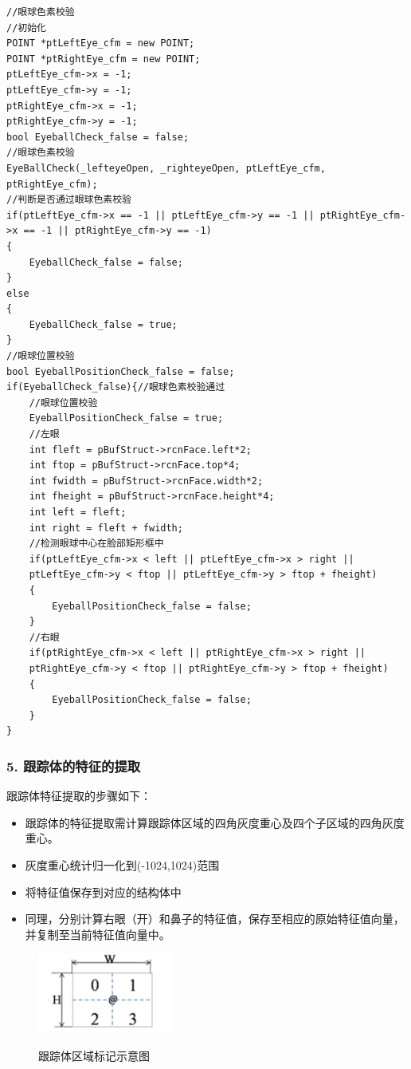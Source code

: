 \documentclass[12pt,hyperref,a4paper,UTF8]{ctexart}
\begin{document}
\begin{lstlisting}[caption={眼球色素和眼球位置校验}, label={lst:example}]
//眼球色素校验
//初始化
POINT *ptLeftEye_cfm = new POINT;
POINT *ptRightEye_cfm = new POINT;
ptLeftEye_cfm->x = -1;
ptLeftEye_cfm->y = -1;
ptRightEye_cfm->x = -1;
ptRightEye_cfm->y = -1;
bool EyeballCheck_false = false;
//眼球色素校验
EyeBallCheck(_lefteyeOpen, _righteyeOpen, ptLeftEye_cfm, ptRightEye_cfm);
//判断是否通过眼球色素校验
if(ptLeftEye_cfm->x == -1 || ptLeftEye_cfm->y == -1 || ptRightEye_cfm->x == -1 || ptRightEye_cfm->y == -1)
{
    EyeballCheck_false = false;
}
else
{
    EyeballCheck_false = true;
}
//眼球位置校验
bool EyeballPositionCheck_false = false;
if(EyeballCheck_false){//眼球色素校验通过
    //眼球位置校验
    EyeballPositionCheck_false = true;
    //左眼
    int fleft = pBufStruct->rcnFace.left*2;
    int ftop = pBufStruct->rcnFace.top*4;
    int fwidth = pBufStruct->rcnFace.width*2;
    int fheight = pBufStruct->rcnFace.height*4;
    int left = fleft;
    int right = fleft + fwidth;
    //检测眼球中心在脸部矩形框中
    if(ptLeftEye_cfm->x < left || ptLeftEye_cfm->x > right || 
    ptLeftEye_cfm->y < ftop || ptLeftEye_cfm->y > ftop + fheight)
    {
        EyeballPositionCheck_false = false;
    }
    //右眼
    if(ptRightEye_cfm->x < left || ptRightEye_cfm->x > right || 
    ptRightEye_cfm->y < ftop || ptRightEye_cfm->y > ftop + fheight)
    {
        EyeballPositionCheck_false = false;
    }
}
        \end{lstlisting}




        \subsubsection*{\large \textbf{5. 跟踪体的特征的提取}}
        跟踪体特征提取的步骤如下：
        \begin{itemize}
            \item 跟踪体的特征提取需计算跟踪体区域的四角灰度重心及四个子区域的四角灰度重心。
            \item 灰度重心统计归一化到(-1024,1024)范围
            \item 将特征值保存到对应的结构体中
            \item 同理，分别计算右眼（开）和鼻子的特征值，保存至相应的原始特征值向量，并复制至当前特征值向量中。
        \end{itemize}

        \begin{figure}[H]
            \centering
            \caption{跟踪体区域标记示意图}
            \includegraphics[width=0.4\textwidth]{./figures/fig/image10.png}
            \label{fig:your_image_label}
        \end{figure}
\end{document}
